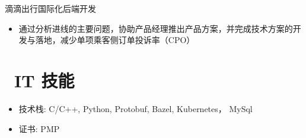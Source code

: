 \documentclass{resume}
\begin{document}
滴滴出行国际化后端开发
\begin{itemize}
  \item 通过分析进线的主要问题，协助产品经理推出产品方案，并完成技术方案的开发与落地，减少单项乘客侧订单投诉率（CPO）
\end{itemize}



\section{\faCogs\ IT 技能}
\begin{itemize}[parsep=0.5ex]
  \item 技术栈: C/C++, Python, Protobuf, Bazel, Kubernetes， MySql
  \item 证书: PMP
\end{itemize}

%
%
\end{document}

